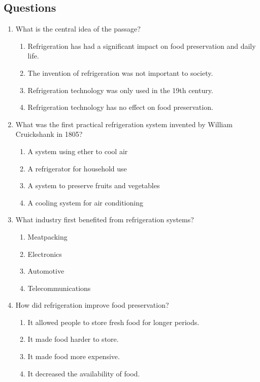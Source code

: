 \documentclass[12pt]{article}
\begin{document}
\subsection*{Questions}

\begin{enumerate}

    \item What is the central idea of the passage?
    \begin{enumerate}[label=\Alph*.]
        \item Refrigeration has had a significant impact on food preservation and daily life.
        \item The invention of refrigeration was not important to society.
        \item Refrigeration technology was only used in the 19th century.
        \item Refrigeration technology has no effect on food preservation.
    \end{enumerate}
    \vspace{0.5cm}

    \item What was the first practical refrigeration system invented by William Cruickshank in 1805?
    \begin{enumerate}[label=\Alph*.]
        \item A system using ether to cool air
        \item A refrigerator for household use
        \item A system to preserve fruits and vegetables
        \item A cooling system for air conditioning
    \end{enumerate}
    \vspace{0.5cm}

    \item What industry first benefited from refrigeration systems?
    \begin{enumerate}[label=\Alph*.]
        \item Meatpacking
        \item Electronics
        \item Automotive
        \item Telecommunications
    \end{enumerate}
    \vspace{0.5cm}

    \item How did refrigeration improve food preservation?
    \begin{enumerate}[label=\Alph*.]
        \item It allowed people to store fresh food for longer periods.
        \item It made food harder to store.
        \item It made food more expensive.
        \item It decreased the availability of food.
    \end{enumerate}
    \vspace{0.5cm}


\end{enumerate}
\end{document}

